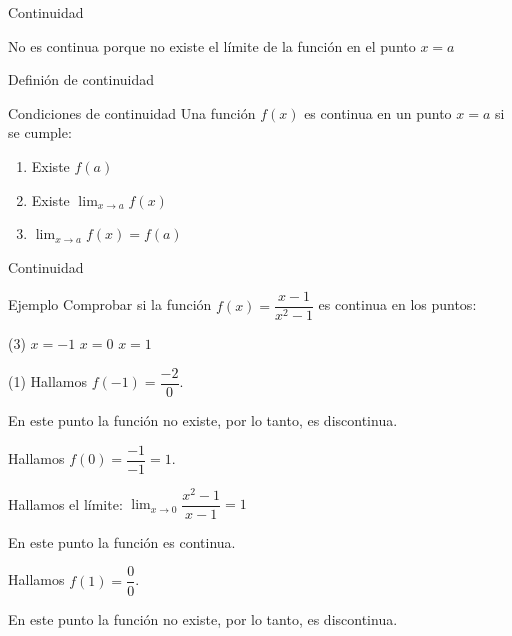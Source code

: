 \documentclass[8pt]{beamer}
\newcommand{\limite}[2]{\displaystyle \lim_{x \rightarrow #1}{#2}}
\begin{document}
\begin{frame}{Continuidad}
\begin{tasks}[label=\alph*)]

\pause
No es continua porque no existe el límite de la  función en el punto $x=a$
\end{tasks}

\end{frame}

\begin{frame}[t]{Definión de continuidad}
\begin{alertblock}{Condiciones de continuidad}
Una función $f(x)$ es continua en un punto $x=a$ si se cumple:
\pause
\begin{enumerate}[<+-| alert@+>]
\item Existe $f(a)$
\item Existe $\displaystyle  \lim_{x \rightarrow a} f(x)$
\item $\displaystyle  \lim_{x \rightarrow a} f(x)=f(a)$
\end{enumerate}
\end{alertblock}
\end{frame}

\begin{frame}[t]{Continuidad}
\begin{exampleblock}{Ejemplo}
Comprobar si la función $f(x)=\dfrac{x-1}{x^2-1}$ es continua en los puntos:
\begin{tasks}[label=\alph*)](3)
\task $x=-1$
\task $x=0$
\task $x=1$
\end{tasks}
\end{exampleblock}
\begin{tasks}[label=\alph*)](1)
\task Hallamos $f(-1)=\dfrac{-2}{0}$. 

En este punto la función no existe, por lo tanto, es discontinua.

\task Hallamos $f(0)=\dfrac{-1}{-1}=1$.

Hallamos el límite: $\limite{0}{\dfrac{x^2-1}{x-1}}=1 $ 

En este punto la función es continua.

\task Hallamos $f(1)=\dfrac{0}{0}$. 

En este punto la función no existe, por lo tanto, es discontinua.
\end{tasks}
\end{frame}
\end{document}
